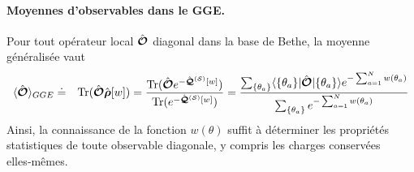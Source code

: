 \paragraph{Moyennes d'observables dans le GGE.}
Pour tout opérateur local $\hat{\bm{\mathcal{O}}}$ diagonal dans la base de Bethe,
la moyenne généralisée vaut
\begin{eqnarray}\label{chap.2.moyenne.1}
	\langle \hat{\bm{\mathcal{O}}}\rangle_{GGE} & \doteq & \displaystyle  \text{Tr} (\hat{\bm{\mathcal{O}}}\hat{\bm{\rho}}[w]) = \frac{\text{Tr} (\hat{\bm{\mathcal{O}}}e^{-\hat{\bm{\mathcal{Q}}}^{(\mathcal{S})}[w]})}{\text{Tr} (e^{-\hat{\bm{\mathcal{Q}}}^{(\mathcal{S})}[w]})}	 = \frac{\sum_{\{\theta_a \}} \langle  \{ \theta_a\}  \vert   \hat{\bm{\mathcal{O}}} \vert \{ \theta_a\} \rangle e^{- \sum_{a = 1}^N w(\theta_a) }  }{\sum_{\{\theta_a  \}} e^{- \sum_{a = 1}^N  w(\theta_a) } }
\end{eqnarray}
Ainsi, la connaissance de la fonction $w(\theta)$ suffit à déterminer
les propriétés statistiques de toute observable diagonale,
y compris les charges conservées elles‑mêmes.	
	

